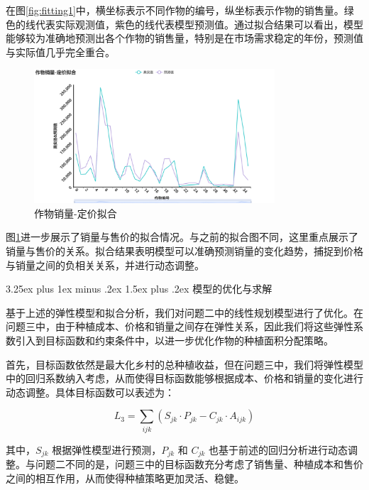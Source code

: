 \documentclass[12pt,a4paper]{nmmcm}
\makeatletter
\renewcommand\subsection{\@startsection{subsection}{2}{0pt}%
    {3.25ex plus 1ex minus .2ex}%
    {1.5ex plus .2ex}%
    {\normalfont\Large\bfseries}}
\makeatother
\begin{document}
在图\ref{fig:fitting1}中，横坐标表示不同作物的编号，纵坐标表示作物的销售量。绿色的线代表实际观测值，紫色的线代表模型预测值。通过拟合结果可以看出，模型能够较为准确地预测出各个作物的销售量，特别是在市场需求稳定的年份，预测值与实际值几乎完全重合。

\begin{figure}[H]
  \centering
  \includegraphics[width=0.8\textwidth]{figures/prob3/correlation/作物销量-定价拟合.png}
  \caption{作物销量-定价拟合}
  \label{fig:fitting2}
\end{figure}

图\ref{fig:fitting2}进一步展示了销量与售价的拟合情况。与之前的拟合图不同，这里重点展示了销量与售价的关系。拟合结果表明模型可以准确预测销量的变化趋势，捕捉到价格与销量之间的负相关关系，并进行动态调整。











\subsection{模型的优化与求解}

基于上述的弹性模型和拟合分析，我们对问题二中的线性规划模型进行了优化。在问题三中，由于种植成本、价格和销量之间存在弹性关系，因此我们将这些弹性系数引入到目标函数和约束条件中，以进一步优化作物的种植面积分配策略。

首先，目标函数依然是最大化乡村的总种植收益，但在问题三中，我们将弹性模型中的回归系数纳入考虑，从而使得目标函数能够根据成本、价格和销量的变化进行动态调整。具体目标函数可以表述为：

\[
L_3 = \sum_{ijk} \left( S_{jk} \cdot P_{jk} - C_{jk} \cdot A_{ijk} \right)
\]

其中，$S_{jk}$ 根据弹性模型进行预测，$P_{jk}$ 和 $C_{jk}$ 也基于前述的回归分析进行动态调整。与问题二不同的是，问题三中的目标函数充分考虑了销售量、种植成本和售价之间的相互作用，从而使得种植策略更加灵活、稳健。
\end{document}
